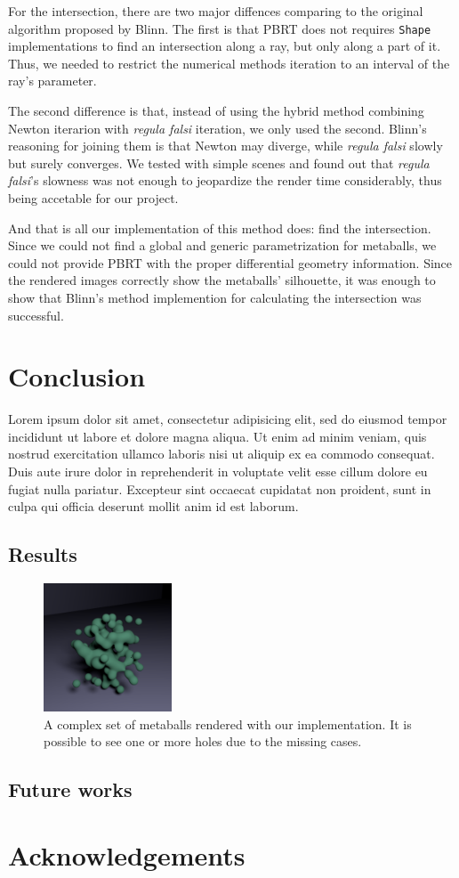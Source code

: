 \documentclass[conference]{acmsiggraph}
\begin{document}
For the intersection, there are two major diffences comparing to the original
algorithm proposed by Blinn. The first is that PBRT does not requires
\texttt{Shape} implementations to find an intersection along a ray, but only
along a part of it. Thus, we needed to restrict the numerical methods iteration
to an interval of the ray's parameter.

The second difference is that, instead of using the hybrid method combining
Newton iterarion with \textit{regula falsi} iteration, we only used the second.
Blinn's reasoning for joining them is that Newton may diverge, while
\textit{regula falsi} slowly but surely converges. We tested with simple scenes
and found out that \textit{regula falsi}'s slowness was not enough to jeopardize
the render time considerably, thus being accetable for our project.

And that is all our implementation of this method does: find the intersection.
Since we could not find a global and generic parametrization for metaballs, we
could not provide PBRT with the proper differential geometry information. Since
the rendered images correctly show the metaballs' silhouette, it was enough to
show that Blinn's method implemention for calculating the intersection was
successful.

\section{Conclusion}

Lorem ipsum dolor sit amet, consectetur adipisicing elit, sed do
eiusmod tempor incididunt ut labore et dolore magna aliqua. Ut enim ad
minim veniam, quis nostrud exercitation ullamco laboris nisi ut
aliquip ex ea commodo consequat. Duis aute irure dolor in
reprehenderit in voluptate velit esse cillum dolore eu fugiat nulla
pariatur. Excepteur sint occaecat cupidatat non proident, sunt in
culpa qui officia deserunt mollit anim id est laborum.

\subsection{Results}

\begin{figure}[ht]
  \centering
  \includegraphics[width=1.5in]{images/blob.png}
  \caption{A complex set of metaballs rendered with our implementation. It is
           possible to see one or more holes due to the missing cases.}
  \label{img:blob}
\end{figure}

\subsection{Future works}

\section*{Acknowledgements}




\end{document}
